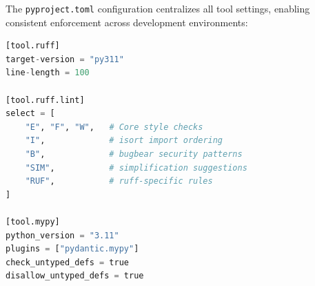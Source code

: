 The \texttt{pyproject.toml} configuration centralizes all tool settings, enabling consistent enforcement across development environments:

\begin{lstlisting}[language=Python, caption={Code quality configuration excerpt from \texttt{pyproject.toml}.}]
[tool.ruff]
target-version = "py311"
line-length = 100

[tool.ruff.lint]
select = [
    "E", "F", "W",   # Core style checks
    "I",             # isort import ordering
    "B",             # bugbear security patterns
    "SIM",           # simplification suggestions
    "RUF",           # ruff-specific rules
]

[tool.mypy]
python_version = "3.11"
plugins = ["pydantic.mypy"]
check_untyped_defs = true
disallow_untyped_defs = true
\end{lstlisting}

